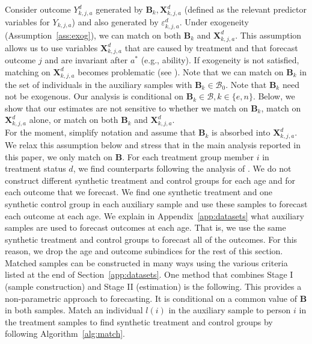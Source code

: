 \noindent Consider outcome $Y^d_{k,j,a}$ generated by $\bm{B}_k, \bm{X}^d_{k,j,a}$ (defined as the relevant predictor variables for $Y_{k,j,a}$) and also generated by $\varepsilon^d_{k,j,a}$. Under exogeneity (Assumption~\ref{ass:exog}), we can match on both $\bm{B}_k$ and $\bm{X}^d_{k,j,a}$. This assumption allows us to  use variables $\bm{X}^d_{k,j,a}$ that are caused by treatment and that forecast outcome $j$ and are invariant after $a^\ast$ (e.g., ability). If exogeneity is not satisfied, matching on $\bm{X}^d_{k,j,a}$ becomes problematic (see \citealp{Heckman_Navarro_2004_REStat}). Note that we can match on $\bm{B}_k$ in the set of individuals in the auxiliary samples with $\bm{B}_k \in \mathcal{B}_{0}$. Note that $\bm{B}_k$ need not be exogenous. Our analysis is conditional on $\bm{B}_k \in \mathcal{B}, k \in \{e,n\}$. Below, we show that our estimates are not sensitive to whether we match on $\bm{B}_k$, match on $\bm{X}^d_{k,j,a}$ alone, or match on both $\bm{B}_k$ and $\bm{X}^d_{k,j,a}$.\\

\noindent For the moment, simplify notation and assume that $\bm{B}_k$ is absorbed into $\bm{X}^d_{k,j,a}$. We relax this assumption below and stress that in the main analysis reported in this paper, we only match on $\bm{B}$. For each treatment group member $i$ in treatment status $d$, we find counterparts following the analysis of \citet{Heckman_Ichimura_etal_1998_REStud}. We do not construct different synthetic treatment and control groups for each age and for each outcome that we forecast. We find one synthetic treatment and one synthetic control group in each auxiliary sample and use these samples to forecast each outcome at each age. We explain in Appendix~\ref{app:datasets} what auxiliary samples are used to forecast outcomes at each age. That is, we use the same synthetic treatment and control groups to forecast all of the outcomes. For this reason, we drop the age and outcome subindices for the rest of this section.\\

\noindent Matched samples can be constructed in many ways using the various criteria listed at the end of Section~\ref{app:datasets}. One method that combines Stage I (sample construction) and Stage II (estimation) is the following. This provides a non-parametric approach to forecasting. It is conditional on a common value of $\bm{B}$ in both samples. Match an individual $l(i)$ in the auxiliary sample to person $i$ in the treatment samples to find synthetic treatment and control groups by following Algorithm~\ref{alg:match}.\\

